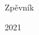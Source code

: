 \documentclass{minimal}
\newlength{\titlefontsize}
\newcommand{\zpevniktitle}{Zpěvník

2021}
\begin{document}
	\begin{center}
		{\fontsize{\titlefontsize}{1.2\titlefontsize}\selectfont \zpevniktitle}
	\end{center}
\end{document}
